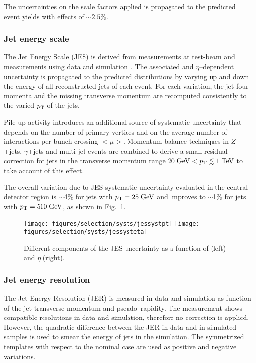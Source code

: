 The uncertainties on the scale factors applied is propagated to the
predicted event yields with effects of $\sim2.5\%$.

\subsubsection{Jet energy scale}
\label{sec:syst_jes}

The Jet Energy Scale (JES) is derived from measurements at test-beam 
and measurements using data and simulation~\cite{jes}. 
The associated \pt{} and $\eta$--dependent uncertainty is propagated
to the predicted distributions by varying up and down the energy of
all reconstructed jets of each event. For each variation, the jet
four--momenta and the missing transverse momentum
\met{} are recomputed consistently to the varied $p_{\mathrm{T}}$ of the jets.

Pile-up activity introduces an additional source of systematic 
uncertainty that depends on the number of primary vertices
and on the average number of interactions per bunch crossing $<\mu>$. 
Momentum balance techniques in $Z$+jets, $\gamma$+jets and 
multi-jet events are combined to derive a small residual correction
for jets in the transverse momentum range $20\; \mathrm{GeV}{}<p_{\mathrm{T}}{}\lesssim
1\; \mathrm{TeV}$ to take account of this effect.

The overall variation due to JES systematic uncertainty 
evaluated in the central detector region 
is $\sim$4\% for jets with $p_{\mathrm{T}}{}=25\; \mathrm{GeV}$ and improves to $\sim$1\% for  
jets with $p_{\mathrm{T}}=500\; \mathrm{GeV}$, as shown in Fig.~\ref{fig:jessyst}.

\begin{figure}\centering
  \texttt{[image: figures/selection/systs/jessystpt]}
  \texttt{[image: figures/selection/systs/jessysteta]}
  \caption{
    Different components of the JES uncertainty as a function of \pt{}
    (left) and $\eta$ (right).
  }
  \label{fig:jessyst}
\end{figure}

\subsubsection{Jet energy resolution}
\label{sec:syst_jer}

The Jet Energy Resolution (JER) is measured in data and simulation
as function of the jet transverse momentum and pseudo--rapidity.
The measurement shows compatible resolutions in data and simulation,
therefore no correction is applied. However, the quadratic difference
between the JER in data and in simulated samples is used to smear the
energy of jets in the simulation. The symmetrized templates with
respect to the nominal case are used as positive and negative
variations.

